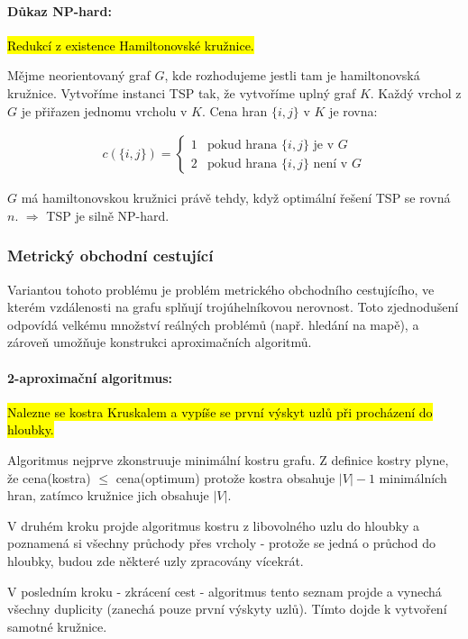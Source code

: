 \paragraph{Důkaz NP-hard:} \hl{Redukcí z existence Hamiltonovské kružnice.}

Mějme neorientovaný graf $G$, kde rozhodujeme jestli tam je hamiltonovská kružnice. Vytvoříme instanci TSP tak, že vytvoříme uplný graf $K$. Každý vrchol z $G$ je přiřazen jednomu vrcholu v $K$. Cena hran $\{i,j\}$ v $K$ je rovna:

\begin{align*}
c(\{i,j\})=\begin{cases}
    1 & \text{pokud hrana $\{i,j\}$ je v $G$}\\
    2 & \text{pokud hrana $\{i,j\}$ není v $G$}
  \end{cases}
\end{align*}

$G$ má hamiltonovskou kružnici právě tehdy, když optimální řešení TSP se rovná $n$. $\Rightarrow$ TSP je silně NP-hard.

\subsubsection{Metrický obchodní cestující}
Variantou tohoto problému je problém metrického obchodního cestujícího, ve kterém vzdálenosti na grafu splňují trojúhelníkovou nerovnost. Toto zjednodušení odpovídá velkému množství reálných problémů (např. hledání na mapě), a zároveň umožňuje konstrukci aproximačních algoritmů.

\paragraph{2-aproximační algoritmus:} \hl{Nalezne se kostra Kruskalem a vypíše se první výskyt uzlů při procházení do hloubky.}

Algoritmus nejprve zkonstruuje minimální kostru grafu. Z definice kostry plyne, že  cena(kostra) $\leq$ cena(optimum) protože kostra obsahuje $\vert V \vert -1$ minimálních hran, zatímco kružnice jich obsahuje $\vert V \vert$.

V druhém kroku projde algoritmus kostru z libovolného uzlu do hloubky a poznamená si všechny průchody přes vrcholy - protože se jedná o průchod do hloubky, budou zde některé uzly zpracovány vícekrát.

V posledním kroku - zkrácení cest - algoritmus tento seznam projde a vynechá všechny duplicity (zanechá pouze první výskyty uzlů). Tímto dojde k vytvoření samotné kružnice.

